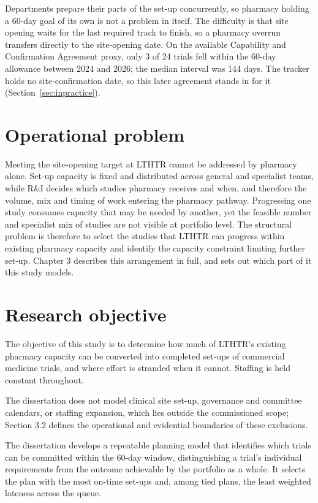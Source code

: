 Departments prepare their parts of the set-up concurrently, so pharmacy holding a 60-day goal of its own is not a problem in itself. The difficulty is that site opening waits for the last required track to finish, so a pharmacy overrun transfers directly to the site-opening date. On the available Capability and Confirmation Agreement proxy, only 3 of 24 trials fell within the 60-day allowance between 2024 and 2026; the median interval was 144 days. The tracker holds no site-confirmation date, so this later agreement stands in for it (Section~\ref{sec:inpractice}).

\section{Operational problem}
\label{sec:opproblem}

Meeting the site-opening target at LTHTR cannot be addressed by pharmacy alone. Set-up capacity is fixed and distributed across general and specialist teams, while R\&I decides which studies pharmacy receives and when, and therefore the volume, mix and timing of work entering the pharmacy pathway. Progressing one study consumes capacity that may be needed by another, yet the feasible number and specialist mix of studies are not visible at portfolio level. The structural problem is therefore to select the studies that LTHTR can progress within existing pharmacy capacity and identify the capacity constraint limiting further set-up. Chapter 3 describes this arrangement in full, and sets out which part of it this study models.

\section{Research objective}
\label{sec:objective}

The objective of this study is to determine how much of LTHTR's existing pharmacy capacity can be converted into completed set-ups of commercial medicine trials, and where effort is stranded when it cannot. Staffing is held constant throughout.

The dissertation does not model clinical site set-up, governance and committee calendars, or staffing expansion, which lies outside the commissioned scope; Section 3.2 defines the operational and evidential boundaries of these exclusions.

The dissertation develops a repeatable planning model that identifies which trials can be committed within the 60-day window, distinguishing a trial's individual requirements from the outcome achievable by the portfolio as a whole. It selects the plan with the most on-time set-ups and, among tied plans, the least weighted lateness across the queue.

